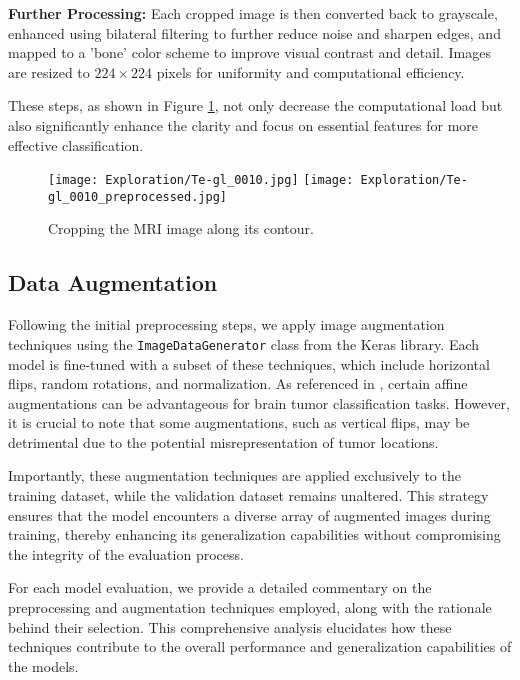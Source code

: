 \textbf{Further Processing:} Each cropped image is then converted back to grayscale, enhanced using bilateral filtering to further reduce noise and sharpen edges, and mapped to a 'bone' color scheme to improve visual contrast and detail. Images are resized to $224 \times 224$
 pixels for uniformity and computational efficiency.

These steps, as shown in Figure \ref{fig:image_cropping}, not only decrease the computational load but also significantly enhance the clarity and focus on essential features for more effective classification.

\begin{figure}[H]
  \begin{center}
    \texttt{[image: Exploration/Te-gl\_0010.jpg]}
    \texttt{[image: Exploration/Te-gl\_0010\_preprocessed.jpg]}
  \end{center}
  \caption{Cropping the MRI image along its contour.}\label{fig:image_cropping}
\end{figure}



\subsection{Data Augmentation}\label{data_augmentation}

Following the initial preprocessing steps, we apply image augmentation techniques using the \texttt{ImageDataGenerator} class from the Keras library. Each model is fine-tuned with a subset of these techniques, which include horizontal flips, random rotations, and normalization. As referenced in \cite{nalepa_data_2019}, certain affine augmentations can be advantageous for brain tumor classification tasks. However, it is crucial to note that some augmentations, such as vertical flips, may be detrimental due to the potential misrepresentation of tumor locations.

Importantly, these augmentation techniques are applied exclusively to the training dataset, while the validation dataset remains unaltered. This strategy ensures that the model encounters a diverse array of augmented images during training, thereby enhancing its generalization capabilities without compromising the integrity of the evaluation process.

For each model evaluation, we provide a detailed commentary on the preprocessing and augmentation techniques employed, along with the rationale behind their selection. This comprehensive analysis elucidates how these techniques contribute to the overall performance and generalization capabilities of the models.

